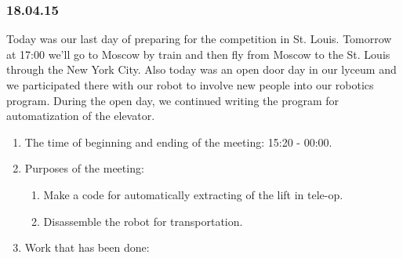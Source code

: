 \subsubsection{18.04.15}
Today was our last day of preparing for the competition in St. Louis. Tomorrow at 17:00 we'll go to Moscow by train and then fly from Moscow to the St. Louis through the New York City.\newline
Also today was an open door day in our lyceum and we participated there with our robot to involve new people into our robotics program. During the open day, we continued writing the program for automatization of the elevator.
\begin{enumerate}
	
	\item The time of beginning and ending of the meeting: 15:20 - 00:00.
	
	\item Purposes of the meeting: 
	\begin{enumerate}
		
		\item Make a code for automatically extracting of the lift in tele-op.
		
		\item Disassemble the robot for transportation.
		
	\end{enumerate}

	\item Work that has been done:
	\begin{enumerate} 
		

\end{enumerate}
\end{enumerate}
